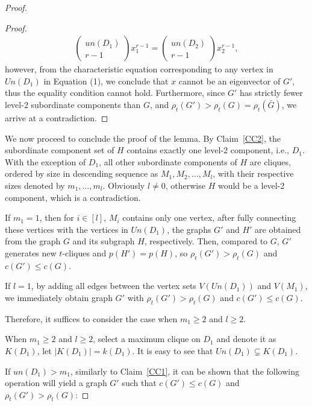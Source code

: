 \documentclass[10pt,a4paper]{amsart}
\begin{document}
\begin{proof}
\begin{proof}
                    \begin{align*}
                        \begin{pmatrix}un(D_1)\\r-1\end{pmatrix}x_1^{r-1}= \begin{pmatrix}un(D_2)\\r-1\end{pmatrix}x_2^{r-1},
			        \end{align*}
                however, from the characteristic equation corresponding to any vertex in ${Un}(D_1)$ in Equation (1), we conclude that $x$ cannot be an eigenvector of $G'$, thus the equality condition cannot hold. Furthermore, since $G'$ has strictly fewer level-2 subordinate components than $G$, and $\rho_t(G') > \rho_t(G) =\rho_t(\bar{G})$, we arrive at a contradiction.

            \end{proof}

            We now proceed to conclude the proof of the lemma. By Claim~\ref{CC2},
            the subordinate component set of $H$ contains exactly one level-2 component, i.e., $D_1$.
            With the exception of $D_1$, all other subordinate components of $H$ are cliques, ordered by size in descending sequence as $M_1, M_2, \ldots, M_l$, with their respective sizes denoted by $m_1, \ldots, m_l$. Obviously $l \neq 0$, otherwise $H$ would be a level-2 component, which is a contradiction.


            If $m_1 = 1$, then for $i \in [l]$, $M_i$ contains only one vertex, after fully connecting these vertices with the vertices in $Un(D_1)$, the graphs $G'$ and $H'$ are obtained from the graph $G$ and its subgraph $H$, respectively. Then, compared to $G$, $G'$ generates new $t$-cliques and $p(H') = p(H)$, so $\rho_t(G') > \rho_t(G)$ and $c(G') \leq c(G)$.

            If $l = 1$, by adding all edges between the vertex sets $V(Un(D_1))$ and $V(M_1)$, we immediately obtain graph $G'$ with $\rho_t(G') > \rho_t(G)$ and $c(G')\leq c(G)$.

            Therefore, it suffices to consider the case when $m_1 \geq 2$ and $l \geq 2$.

            When $m_1 \geq 2$ and $l \geq 2$, select a maximum clique on $D_1$ and denote it as $K(D_1)$, let $|K(D_1)| = k(D_1)$. It is easy to see that $Un(D_1) \subsetneq K(D_1)$.

            If $un(D_1) > m_1$, similarly to Claim~\ref{CC1}, it can be shown that the following operation will yield a graph $G'$ such that $c(G') \leq c(G)$ and $\rho_t(G') > \rho_t(G)$:


\end{proof}
\end{document}

